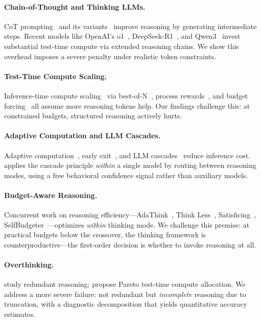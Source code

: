 
\paragraph{Chain-of-Thought and Thinking LLMs.}
CoT prompting~\citep{wei2022chain} and its variants~\citep{wang2023selfconsistency, yao2023tree} improve reasoning by generating intermediate steps.
Recent models like OpenAI's o1~\citep{openai2024o1}, DeepSeek-R1~\citep{deepseekr1}, and Qwen3~\citep{qwen3_2025} invest substantial test-time compute via extended reasoning chains.
We show this overhead imposes a severe penalty under realistic token constraints.

\paragraph{Test-Time Compute Scaling.}
Inference-time compute scaling~\citep{snell2024scaling} via best-of-N~\citep{lightman2023prm}, process rewards~\citep{wang2024math}, and budget forcing~\citep{muennighoff2025s1} all assume more reasoning tokens help.
Our findings challenge this: at constrained budgets, structured reasoning actively hurts.

\paragraph{Adaptive Computation and LLM Cascades.}
Adaptive computation~\citep{graves2016adaptive}, early exit~\citep{schuster2022confident, bae2023fast}, and LLM cascades~\citep{chen2023frugalgpt} reduce inference cost.
\method{} applies the cascade principle \emph{within} a single model by routing between reasoning modes, using a free behavioral confidence signal rather than auxiliary models.

\paragraph{Budget-Aware Reasoning.}
Concurrent work on reasoning efficiency---AdaThink~\citep{adathink2025}, Think Less~\citep{hou2025thinkless}, Satisficing~\citep{luo2025satisficing}, SelfBudgeter~\citep{liu2025selfbudgeter}---optimizes \emph{within} thinking mode.
We challenge this premise: at practical budgets below the crossover, the thinking framework is counterproductive---the first-order decision is whether to invoke reasoning at all.

\paragraph{Overthinking.}
\citet{chen2024overthinking} study redundant reasoning; \citet{nvidia2025pareto} propose Pareto test-time compute allocation.
We address a more severe failure: not redundant but \emph{incomplete} reasoning due to truncation, with a diagnostic decomposition that yields quantitative accuracy estimates.
